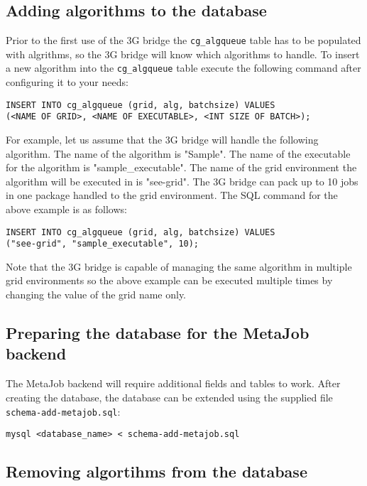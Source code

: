 \documentclass[a4paper, 12pt]{article}
\begin{document}
\subsection{Adding algorithms to the database}
\label{sec:add-algs}

Prior to the first use of the 3G bridge the {\tt cg\_algqueue} table has to be populated with algrithms, so the 3G bridge will know which algorithms to handle. To insert a new algorithm into the {\tt cg\_algqueue} table execute the following command after configuring it to your needs:

\begin{verbatim}
INSERT INTO cg_algqueue (grid, alg, batchsize) VALUES 
(<NAME OF GRID>, <NAME OF EXECUTABLE>, <INT SIZE OF BATCH>);
\end{verbatim}

For example, let us assume that the 3G bridge will handle the following algorithm. The name of the algorithm is "Sample". The name of the executable for the algorithm is "sample\_executable". The name of the grid environment the algorithm will be executed in is "see-grid". The 3G bridge can pack up to 10 jobs in one package handled to the grid environment. The SQL command for the above example is as follows:

\begin{verbatim}
INSERT INTO cg_algqueue (grid, alg, batchsize) VALUES 
("see-grid", "sample_executable", 10);
\end{verbatim}

Note that the 3G bridge is capable of managing the same algorithm in multiple grid environments so the above example can be executed multiple times by changing the value of the grid name only.

\subsection{Preparing the database for the MetaJob backend}
\label{sec:db-metajob}

The MetaJob backend will require additional fields and tables to work. After
creating the database, the database can be extended using the supplied file {\tt
  schema-add-metajob.sql}:
\begin{verbatim}
mysql <database_name> < schema-add-metajob.sql
\end{verbatim}

\subsection{Removing algortihms from the database}
\end{document}
